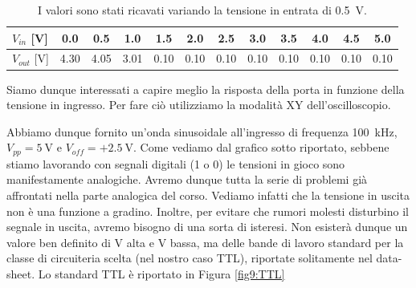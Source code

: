 
\begin{table}[htpc]
\centering
{\renewcommand{\arraystretch}{1.1}%
\begin{tabular}{l|c|c|c|c|c|c|c|c|c|c|c}
$V_{in}$ [\si{\volt}] & 0.0 & 0.5 & 1.0 & 1.5 & 2.0 & 2.5 & 3.0 & 3.5 & 4.0 & 4.5 & 5.0 \\
\hline
$V_{out}$ [\si{\volt}] & 4.30 & 4.05 & 3.01 & 0.10 & 0.10 & 0.10 & 0.10 & 0.10 & 0.10 & 0.10 & 0.10 \\
\end{tabular}}
\caption{I valori sono stati ricavati variando la tensione in entrata di \SI{.5}{\V}.}
\label{tab9:risposta2}
\end{table}

Siamo dunque interessati a capire meglio la risposta della porta in funzione della tensione in ingresso.
Per fare ciò utilizziamo la modalità XY dell'oscilloscopio.

Abbiamo dunque fornito un'onda sinusoidale all'ingresso di frequenza \SI{100}{\kilo\hertz}, $V_{pp}=\SI{5}{\volt}$ e $V_{off}=+\SI{2.5}{\volt}$.
Come vediamo dal grafico sotto riportato, sebbene stiamo lavorando con segnali digitali (1 o 0) le tensioni in gioco sono manifestamente analogiche.
Avremo dunque tutta la serie di problemi già affrontati nella parte analogica del corso.
Vediamo infatti che la tensione in uscita non è una funzione a gradino.
Inoltre, per evitare che rumori molesti disturbino il segnale in uscita, avremo bisogno di una sorta di isteresi.
Non esisterà dunque un valore ben definito di V alta e V bassa, ma delle bande di lavoro standard per la classe di circuiteria scelta (nel nostro caso TTL), riportate solitamente nel data-sheet.
Lo standard TTL è riportato in Figura \ref{fig9:TTL}

